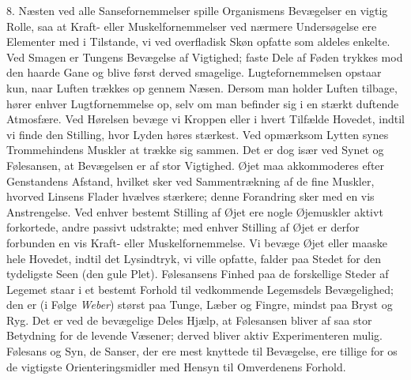 \documentclass[12pt,a4paper,openany]{book}
\newcommand{\opage}[1]{\marginnote{\footnotesize\textit{[#1]}}}
\begin{document}
8. Næsten ved alle Sansefornemmelser spille Organismens Bevægelser en
vigtig Rolle, saa at Kraft- eller Muskelfornemmelser ved nærmere
Undersøgelse ere Elementer med i Tilstande, vi ved overfladisk Skøn
opfatte som aldeles enkelte. Ved Smagen er Tungens Bevægelse af
Vigtighed; faste Dele af Føden trykkes mod den haarde Gane og blive
først derved smagelige. Lugtefornemmelsen opstaar kun, naar Luften
trækkes op gennem Næsen. Dersom man holder Luften tilbage, hører enhver
Lugtfornemmelse op, selv om man befinder sig i en stærkt duftende
Atmosfære. Ved Hørelsen bevæge vi Kroppen eller i hvert Tilfælde
Hovedet, indtil vi finde den Stilling, hvor Lyden høres stærkest. Ved
opmærksom Lytten synes Trommehindens Muskler at trække sig sammen. Det
er dog især ved Synet og Følesansen, at Bevægelsen er af stor Vigtighed.
Øjet maa akkommoderes efter Genstandens Afstand, hvilket sker ved
Sammentrækning af de fine Muskler, hvorved Linsens Flader hvælves
stærkere; denne Forandring sker med en vis Anstrengelse. Ved enhver
bestemt Stilling af Øjet ere nogle Øjemuskler aktivt forkortede, andre
passivt udstrakte; med
\opage{148}enhver Stilling af Øjet er derfor forbunden en vis Kraft-
eller Muskelfornemmelse. Vi bevæge Øjet eller maaske hele Hovedet,
indtil det Lysindtryk, vi ville opfatte, falder paa Stedet for den
tydeligste Seen (den gule Plet). Følesansens Finhed paa de forskellige
Steder af Legemet staar i et bestemt Forhold til vedkommende Legemsdels
Bevægelighed; den er (i Følge \emph{Weber}) størst paa Tunge, Læber og
Fingre, mindst paa Bryst og Ryg. Det er ved de bevægelige Deles Hjælp,
at Følesansen bliver af saa stor Betydning for de levende Væsener;
derved bliver aktiv Experimenteren mulig. Følesans og Syn, de Sanser,
der ere mest knyttede til Bevægelse, ere tillige for os de vigtigste
Orienteringsmidler med Hensyn til Omverdenens Forhold.
\end{document}
